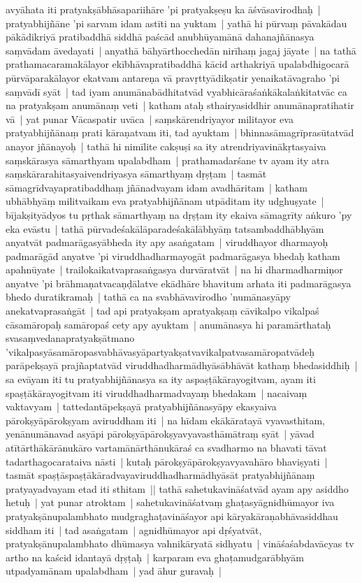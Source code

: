 \documentclass[article,12pt,a4paper]{memoir}%
\begin{document}
avyāhata iti pratyakṣābhāsapariihāre 'pi pratyakṣeṣu ka āśvāsavirodhaḥ | \label{thakur75-117.21} pratyabhijñāne 'pi sarvam idam astīti na yuktam | yathā hi pūrvaṃ pāvakādau pākādikriyā pratibaddhā siddhā paścād anubhūyamānā dahanajñānasya saṃvādam āvedayati | anyathā bāhyārthocchedān nirīhaṃ jagaj jāyate | na tathā prathamacaramakālayor ekībhāvapratibaddhā kācid arthakriyā upalabdhigocarā pūrvāparakālayor ekatvam antareṇa vā pravṛttyādikṣatir yenaikatāvagraho 'pi saṃvādī syāt | \label{thakur75-117.26} tad iyam anumānabādhitatvād vyabhicāraśaṅkākalaṅkitatvāc ca na pratyakṣam anumānaṃ veti | katham ataḥ sthairyasiddhir anumānapratihatir vā | \label{thakur75-117.28} yat punar Vācaspatir uvāca | saṃskārendriyayor militayor eva pratyabhijñānaṃ prati kāraṇatvam iti, tad ayuktam | bhinnasāmagrīprasūtatvād anayor jñānayoḥ | tathā hi nimīlite cakṣuṣi sa ity atrendriyavinākṛtasyaiva saṃskārasya sāmarthyam upalabdham | prathamadarśane tv ayam ity atra saṃskārarahitasyaivendriyasya sāmarthyaṃ dṛṣṭam | tasmāt sāmagrīdvayapratibaddhaṃ jñānadvayam idam avadhāritam | katham ubhābhyāṃ militvaikam eva pratyabhijñānam utpāditam ity udghuṣyate | bījakṣityādyos tu pṛthak sāmarthyaṃ na dṛṣṭam ity ekaiva sāmagrīty aṅkuro 'py eka evāstu | \label{thakur75-118.3} tathā pūrvadeśakālāparadeśakālābhyāṃ tatsambaddhābhyām anyatvāt padmarāgasyābheda ity apy asaṅgatam | viruddhayor dharmayoḥ padmarāgād anyatve 'pi viruddhadharmayogāt padmarāgasya bhedaḥ katham apahnūyate | trailokaikatvaprasaṅgasya durvāratvāt | na hi dharmadharmiṇor anyatve 'pi brāhmaṇatvacaṇḍālatve ekādhāre bhavitum arhata iti padmarāgasya bhedo duratikramaḥ | \label{thakur75-118.7} tathā ca na svabhāvavirodho 'numānasyāpy anekatvaprasaṅgāt | tad api pratyakṣam apratyakṣaṃ cāvikalpo vikalpaś cāsamāropaḥ samāropaś cety apy ayuktam | anumānasya hi paramārthataḥ svasaṃvedanapratyakṣātmano 'vikalpasyāsamāropasvabhāvasyāpartyakṣatvavikalpatvasamāropatvādeḥ parāpekṣayā prajñaptatvād viruddhadharmādhyāsābhāvāt kathaṃ bhedasiddhiḥ | sa evāyam iti tu pratyabhijñānasya sa ity aspaṣṭākārayogitvam, ayam iti spaṣṭākārayogitvam iti viruddhadharmadvayaṃ bhedakam | \label{thakur75-118.13} nacaivaṃ vaktavyam | tattedantāpekṣayā pratyabhijñānasyāpy ekasyaiva pārokṣyāpārokṣyam aviruddham iti | na hīdam ekākāratayā vyavasthitam, yenānumānavad asyāpi pārokṣyāpārokṣyavyavasthāmātraṃ syāt | yāvad atītārthākārānukāro vartamānārthānukāraś ca svadharmo na bhavati tāvat tadarthagocarataiva nāsti | kutaḥ pārokṣyāpārokṣyavyavahāro bhaviṣyati | tasmāt spaṣṭāspaṣṭākāradvayaviruddhadharmādhyāsāt pratyabhijñānaṃ pratyayadvayam etad iti sthitam || \label{thakur75-118.19} tathā sahetukavināśatvād ayam apy asiddho hetuḥ | yat punar atroktam | sahetukavināśatvaṃ ghaṭasyāgnidhūmayor iva pratyakṣānupalambhato mudgraghaṭavināśayor api kāryakāraṇabhāvasiddhau siddham iti | tad asaṅgatam | agnidhūmayor api dṛśyatvāt, pratyakṣānupalambhato dhūmasya vahnikāryatā sidhyatu | vināśaśabdavācyas tv artho na kaścid idantayā dṛṣṭaḥ | karparam eva ghaṭamudgarābhyām utpadyamānam upalabdham | \label{thakur75-118.23} yad āhur guravaḥ |
\end{document}
